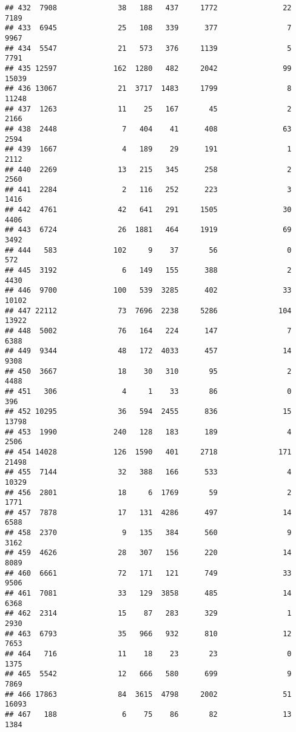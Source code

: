 \documentclass[
]{article}
\begin{document}
\begin{verbatim}
## 432  7908              38   188   437     1772               22  7189
## 433  6945              25   108   339      377                7  9967
## 434  5547              21   573   376     1139                5  7791
## 435 12597             162  1280   482     2042               99 15039
## 436 13067              21  3717  1483     1799                8 11248
## 437  1263              11    25   167       45                2  2166
## 438  2448               7   404    41      408               63  2594
## 439  1667               4   189    29      191                1  2112
## 440  2269              13   215   345      258                2  2560
## 441  2284               2   116   252      223                3  1416
## 442  4761              42   641   291     1505               30  4406
## 443  6724              26  1881   464     1919               69  3492
## 444   583             102     9    37       56                0   572
## 445  3192               6   149   155      388                2  4430
## 446  9700             100   539  3285      402               33 10102
## 447 22112              73  7696  2238     5286              104 13922
## 448  5002              76   164   224      147                7  6388
## 449  9344              48   172  4033      457               14  9308
## 450  3667              18    30   310       95                2  4488
## 451   306               4     1    33       86                0   396
## 452 10295              36   594  2455      836               15 13798
## 453  1990             240   128   183      189                4  2506
## 454 14028             126  1590   401     2718              171 21498
## 455  7144              32   388   166      533                4 10329
## 456  2801              18     6  1769       59                2  1771
## 457  7878              17   131  4286      497               14  6588
## 458  2370               9   135   384      560                9  3162
## 459  4626              28   307   156      220               14  8089
## 460  6661              72   171   121      749               33  9506
## 461  7081              33   129  3858      485               14  6368
## 462  2314              15    87   283      329                1  2930
## 463  6793              35   966   932      810               12  7653
## 464   716              11    18    23       23                0  1375
## 465  5542              12   666   580      699                9  7869
## 466 17863              84  3615  4798     2002               51 16093
## 467   188               6    75    86       82               13  1384

\end{verbatim}
\end{document}
